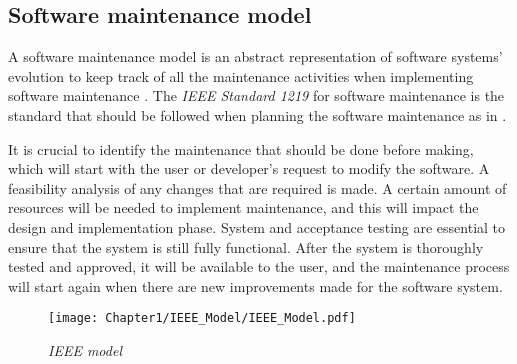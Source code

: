 \subsection{Software maintenance model}
A software maintenance model is an abstract representation of software systems' evolution to keep track of all the maintenance activities when implementing software maintenance \cite{Ren2011}. The \textit{IEEE Standard 1219} for software maintenance is the standard that should be followed when planning the software maintenance as in .\par It is crucial to identify the maintenance that should be done before making, which will start with the user or developer's request to modify the software. A feasibility analysis of any changes that are required is made. A certain amount of resources will be needed to implement maintenance, and this will impact the design and implementation phase. System and acceptance testing are essential to ensure that the system is still fully functional. After the system is thoroughly tested and approved, it will be available to the user, and the maintenance process will start again when there are new improvements made for the software system.

\begin{figure}[!htb] %
	\centering %
	\texttt{[image: Chapter1/IEEE\_Model/IEEE\_Model.pdf]}
	\caption[IEEE model]
	{\textit{IEEE model \cite{Ren2011}}} \label{fig:CH1_IEEE_Model}
\end{figure}

